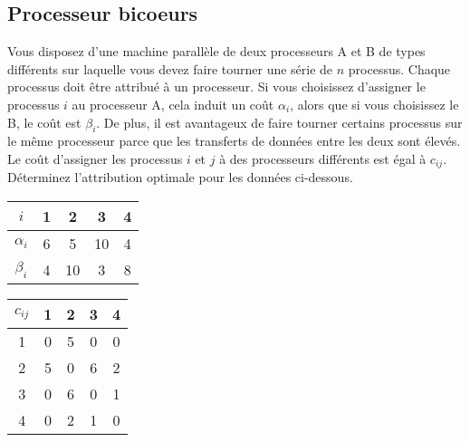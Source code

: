 \subsection{Processeur bicoeurs}
Vous disposez d'une machine parallèle de deux processeurs A et B de types différents sur laquelle vous devez faire tourner une série de $n$ processus. Chaque processus doit être attribué à un processeur. Si vous choisissez d'assigner le processus $i$ au processeur A, cela induit un coût $\alpha_i$, alors que si vous choisissez le B, le coût est $\beta_i$. De plus, il est avantageux de faire tourner certains processus sur le même processeur parce que les transferts de données entre les deux sont élevés. Le coût d'assigner les processus $i$ et $j$ à des processeurs différents est égal à $c_{ij}$. Déterminez l'attribution optimale pour les données ci-dessous.

\begin{multicols}{2}

\begin{center}
\begin{tabular}{||c||c|c|c|c||}
\hline
$i$ & 1 & 2 & 3 & 4 \\
\hline
$\alpha_i$ & 6 & 5 & 10 & 4 \\
\hline
$\beta_i$ & 4 & 10 & 3 & 8 \\
\hline
\end{tabular}
\end{center}

\columnbreak

\begin{center}
\begin{tabular}{||c||c|c|c|c||}
\hline
$c_{ij}$ & 1 & 2 & 3 & 4 \\
\hline
1 & 0 & 5 & 0 & 0 \\
\hline
2 & 5 & 0 & 6 & 2 \\
\hline
3 & 0 & 6 & 0 & 1 \\
\hline
4 & 0 & 2 & 1 & 0 \\
\hline
\end{tabular}
\end{center}

\end{multicols}

